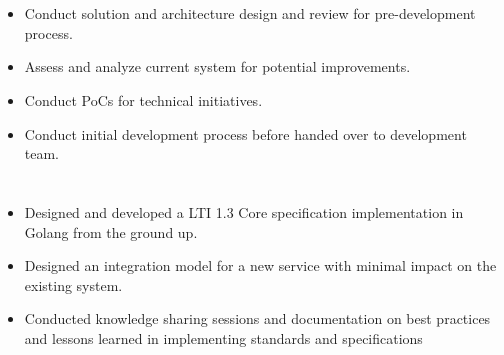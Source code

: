 \documentclass[12pt]{res} %
\begin{document}
\begin{resume}

\begin{multicols}{2}
	\section{}
		\begin{itemize}
			\item Conduct solution and architecture design and review for pre-development process.
			\item Assess and analyze current system for potential improvements.
			\item Conduct PoCs for technical initiatives.
			\item Conduct initial development process before handed over to development team.
		\end{itemize}
	\section{}
		\begin{itemize}
			\item Designed and developed a LTI 1.3 Core specification implementation in Golang from the ground up.
			\item Designed an integration model for a new service with minimal impact on the existing system.
			\item Conducted knowledge sharing sessions and documentation on best practices and lessons learned in implementing standards and specifications
		\end{itemize}
\end{multicols}


\end{resume}
\end{document}
